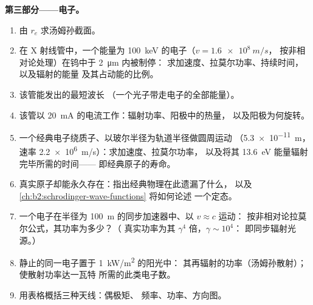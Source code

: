\begin{problem}
\medskip
\noindent\textbf{第三部分——电子。}
\begin{enumerate}[resume]
  \item 由 $r_e$ 求汤姆孙截面。
  \item 在 X 射线管中，一个能量为 \qty{100}{keV} 的电子（$v = \qty{1.6e8}{m/s}$，
        按非相对论处理）在钨中于 \qty{2}{\micro m} 内被制停：
        求加速度、拉莫尔功率、持续时间，以及辐射的能量
        及其占动能的比例。
  \item 该管能发出的最短波长
        （一个光子带走电子的全部能量）。
  \item 该管以 \qty{20}{mA} 的电流工作：辐射功率、阳极中的热量，
        以及阳极为何旋转。
  \item 一个经典电子绕质子、以玻尔半径为轨道半径做圆周运动
        （\qty{5.3e-11}{m}，速率 \qty{2.2e6}{m/s}）：求加速度、拉莫尔功率，
        以及将其 \qty{13.6}{eV} 能量辐射完毕所需的时间——
        即经典原子的寿命。
  \item 真实原子却能永久存在：指出经典物理在此遗漏了什么，
        以及 \cref{ch:b2:schrodinger-wave-functions} 将如何论述
        一个定态。
  \item 一个电子在半径为 \qty{100}{m} 的同步加速器中、以 $v \approx c$ 运动：
        按非相对论拉莫尔公式，其功率为多少？（
        真实功率为其 $\gamma^4$ 倍，$\gamma \sim 10^4$：
        即同步辐射光源。）
  \item 静止的同一电子置于 \qty{1}{kW/m^2} 的阳光中：
        其再辐射的功率（汤姆孙散射）；使散射功率达一瓦特
        所需的此类电子数。
  \item 用表格概括三种天线：偶极矩、
        频率、功率、方向图。
\end{enumerate}
\end{problem}
